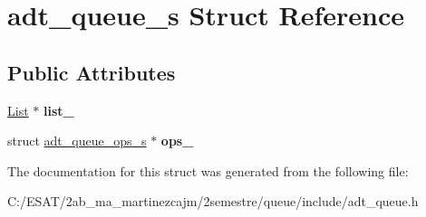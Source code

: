 \hypertarget{structadt__queue__s}{}\section{adt\+\_\+queue\+\_\+s Struct Reference}
\label{structadt__queue__s}
\subsection*{Public Attributes}
\begin{DoxyCompactItemize}
\item 
\mbox{\label{structadt__queue__s_a1619d92e83571ce9f6ba6ad246566ded}} 
\hyperlink{structadt__list__s}{List} $\ast$ {\bfseries list\+\_\+}
\item 
\mbox{\label{structadt__queue__s_a3ff022566e8d972d76e49fd16bbcdef7}} 
struct \hyperlink{structadt__queue__ops__s}{adt\+\_\+queue\+\_\+ops\+\_\+s} $\ast$ {\bfseries ops\+\_\+}
\end{DoxyCompactItemize}


The documentation for this struct was generated from the following file\+:\begin{DoxyCompactItemize}
\item 
C\+:/\+E\+S\+A\+T/2ab\+\_\+ma\+\_\+martinezcajm/2semestre/queue/include/adt\+\_\+queue.\+h\end{DoxyCompactItemize}
